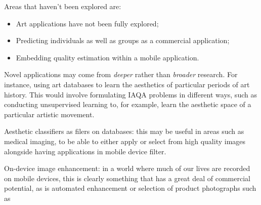 Areas that haven't been explored are:

\begin{itemize}
    \item Art applications have not been fully explored;
    \item Predicting individuals as well as groups as a commercial application;
    \item Embedding quality estimation within a mobile application.
\end{itemize}

Novel applications may come from \textit{deeper} rather than \textit{broader} research. For instance, using art databases to learn the aesthetics of particular periods of art history. This would involve formulating IAQA problems in different ways, such as conducting unsupervised learning to, for example, learn the aesthetic space of a particular artistic movement. 


Aesthetic classifiers as filers on databases: this may be useful in areas such as medical imaging, to be able to either apply or select from high quality images alongside having applications in mobile device filter. 

On-device image enhancement: in a world where much of our lives are recorded on mobile devices, this is clearly something that has a great deal of commercial potential, as is automated enhancement or selection of product photographs such as \cite{idealo2021}



\

        
        
        
        
        
        
